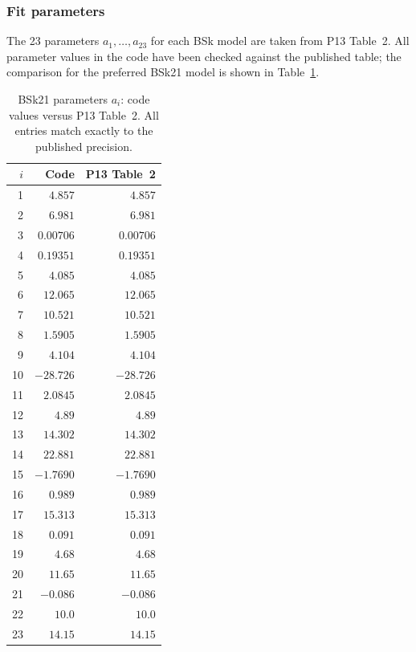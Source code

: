 \subsubsection{Fit parameters}

The 23 parameters $a_1,\ldots,a_{23}$ for each BSk model are taken from
P13 Table~2.  All parameter values in the code have been checked against the
published table; the comparison for the preferred BSk21 model is shown in
Table~\ref{tab:bsk21_params}.

\begin{table}[htbp]
\centering
\caption{BSk21 parameters $a_i$: code values versus P13 Table~2.
All entries match exactly to the published precision.}
\label{tab:bsk21_params}
\begin{tabular}{r r r}
\hline
$i$ & Code & P13 Table~2 \\
\hline
 1 & $4.857$    & $4.857$ \\
 2 & $6.981$    & $6.981$ \\
 3 & $0.00706$  & $0.00706$ \\
 4 & $0.19351$  & $0.19351$ \\
 5 & $4.085$    & $4.085$ \\
 6 & $12.065$   & $12.065$ \\
 7 & $10.521$   & $10.521$ \\
 8 & $1.5905$   & $1.5905$ \\
 9 & $4.104$    & $4.104$ \\
10 & $-28.726$  & $-28.726$ \\
11 & $2.0845$   & $2.0845$ \\
12 & $4.89$     & $4.89$ \\
13 & $14.302$   & $14.302$ \\
14 & $22.881$   & $22.881$ \\
15 & $-1.7690$  & $-1.7690$ \\
16 & $0.989$    & $0.989$ \\
17 & $15.313$   & $15.313$ \\
18 & $0.091$    & $0.091$ \\
19 & $4.68$     & $4.68$ \\
20 & $11.65$    & $11.65$ \\
21 & $-0.086$   & $-0.086$ \\
22 & $10.0$     & $10.0$ \\
23 & $14.15$    & $14.15$ \\
\hline
\end{tabular}
\end{table}

